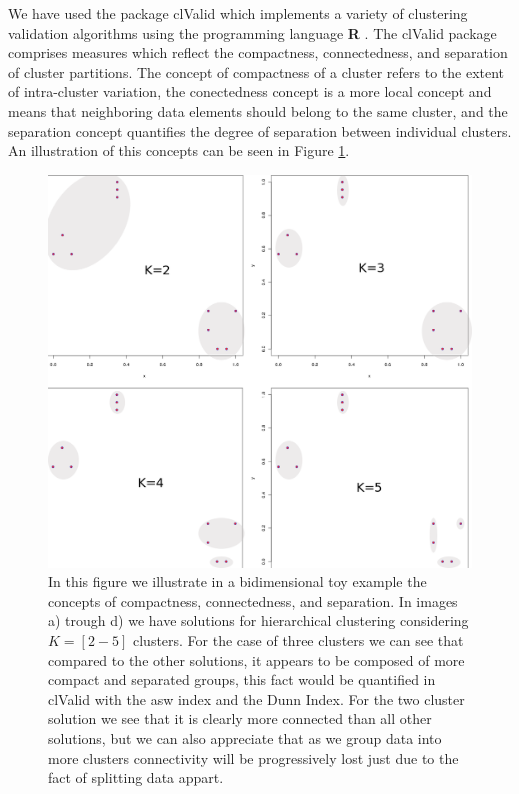 We have  used the package clValid \cite{brock2008}  which implements a
variety  of  clustering validation  algorithms  using the  programming
language  \textbf{R}  \cite{rcite}.   The  clValid  package  comprises
measures which reflect  the compactness, connectedness, and separation
of cluster partitions. The concept  of compactness of a cluster refers
to the extent of  intra-cluster variation, the conectedness concept is
a more local  concept and means that neighboring  data elements should
belong to the same cluster, and the separation concept quantifies the
degree of separation between individual clusters. An illustration of
this concepts can be seen in Figure \ref{fig:concomsep}.

\begin{figure}
\centering
\includegraphics[scale=0.3]{Appendix/consilcom.png}
\caption{In this  figure we illustrate in a  bidimensional toy example
  the  concepts  of compactness,  connectedness,  and separation.   In
  images a)  trough d) we  have solutions for  hierarchical clustering
  considering $K=[2-5]$  clusters. For the  case of three  clusters we
  can  see that  compared to  the other  solutions, it  appears  to be
  composed of  more compact and  separated groups, this fact  would be
  quantified in  clValid with the asw  index and the  Dunn Index. For
  the two cluster  solution we see that it  is clearly more connected
  than  all other solutions,  but we  can also  appreciate that  as we
  group  data into  more clusters  connectivity will  be progressively
  lost just due to the fact of splitting data appart.}
\label{fig:concomsep}
\end{figure}  

